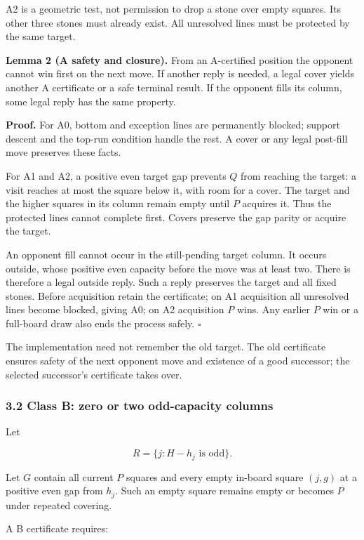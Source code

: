 \documentclass[
  a4paper,
]{article}
\begin{document}
A2 is a geometric test, not permission to drop a stone over empty
squares. Its other three stones must already exist. All unresolved lines
must be protected by the same target.

\textbf{Lemma 2 (A safety and closure).} From an A-certified position
the opponent cannot win first on the next move. If another reply is
needed, a legal cover yields another A certificate or a safe terminal
result. If the opponent fills its column, some legal reply has the same
property.

\textbf{Proof.} For A0, bottom and exception lines are permanently
blocked; support descent and the top-run condition handle the rest. A
cover or any legal post-fill move preserves these facts.

For A1 and A2, a positive even target gap prevents \(Q\) from reaching
the target: a visit reaches at most the square below it, with room for a
cover. The target and the higher squares in its column remain empty
until \(P\) acquires it. Thus the protected lines cannot complete first.
Covers preserve the gap parity or acquire the target.

An opponent fill cannot occur in the still-pending target column. It
occurs outside, whose positive even capacity before the move was at
least two. There is therefore a legal outside reply. Such a reply
preserves the target and all fixed stones. Before acquisition retain the
certificate; on A1 acquisition all unresolved lines become blocked,
giving A0; on A2 acquisition \(P\) wins. Any earlier \(P\) win or a
full-board draw also ends the process safely. \(\square\)

The implementation need not remember the old target. The old certificate
ensures safety of the next opponent move and existence of a good
successor; the selected successor's certificate takes over.

\subsubsection{3.2 Class B: zero or two odd-capacity
columns}\label{class-b-zero-or-two-odd-capacity-columns}

Let

\[R=\{j:H-h_j\text{ is odd}\}.\]

Let \(G\) contain all current \(P\) squares and every empty in-board
square \((j,g)\) at a positive even gap from \(h_j\). Such an empty
square remains empty or becomes \(P\) under repeated covering.

A B certificate requires:
\end{document}
